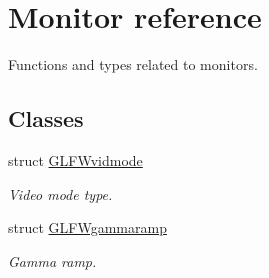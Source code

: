 \hypertarget{group__monitor}{}\section{Monitor reference}
\label{group__monitor}


Functions and types related to monitors.  


\subsection*{Classes}
\begin{DoxyCompactItemize}
\item 
struct \mbox{\hyperlink{struct_g_l_f_wvidmode}{G\+L\+F\+Wvidmode}}
\begin{DoxyCompactList}\small\item\em Video mode type. \end{DoxyCompactList}\item 
struct \mbox{\hyperlink{struct_g_l_f_wgammaramp}{G\+L\+F\+Wgammaramp}}
\begin{DoxyCompactList}\small\item\em Gamma ramp. \end{DoxyCompactList}\end{DoxyCompactItemize}
